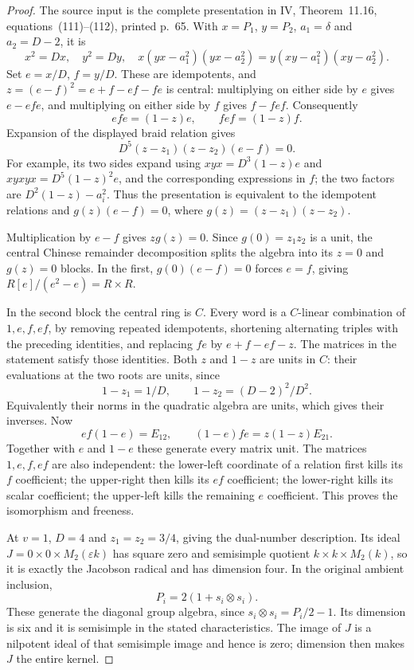 \begin{proof}
The source input is the complete presentation in IV, Theorem~11.16, equations~(111)--(112), printed p.~65. With $x=P_1$, $y=P_2$, $a_1=\delta$ and $a_2=D-2$, it is
\[
 x^2=Dx,\quad y^2=Dy,\quad
 x(yx-a_1^2)(yx-a_2^2)=y(xy-a_1^2)(xy-a_2^2).
\]
Set $e=x/D$, $f=y/D$. These are idempotents, and $z=(e-f)^2=e+f-ef-fe$ is central: multiplying on either side by $e$ gives $e-efe$, and multiplying on either side by $f$ gives $f-fef$. Consequently
\[
 efe=(1-z)e,\qquad fef=(1-z)f.
\]
Expansion of the displayed braid relation gives
\[
 D^5(z-z_1)(z-z_2)(e-f)=0.
\]
For example, its two sides expand using $xyx=D^3(1-z)e$ and $xyxyx=D^5(1-z)^2e$, and the corresponding expressions in $f$; the two factors are $D^2(1-z)-a_i^2$. Thus the presentation is equivalent to the idempotent relations and $g(z)(e-f)=0$, where $g(z)=(z-z_1)(z-z_2)$.

Multiplication by $e-f$ gives $zg(z)=0$. Since $g(0)=z_1z_2$ is a unit, the central Chinese remainder decomposition splits the algebra into its $z=0$ and $g(z)=0$ blocks. In the first, $g(0)(e-f)=0$ forces $e=f$, giving $R[e]/(e^2-e)=R\times R$.

In the second block the central ring is $C$. Every word is a $C$-linear combination of $1,e,f,ef$, by removing repeated idempotents, shortening alternating triples with the preceding identities, and replacing $fe$ by $e+f-ef-z$. The matrices in the statement satisfy those identities. Both $z$ and $1-z$ are units in $C$: their evaluations at the two roots are units, since
\[
 1-z_1=1/D,\qquad 1-z_2=(D-2)^2/D^2.
\]
Equivalently their norms in the quadratic algebra are units, which gives their inverses. Now
\[
 ef(1-e)=E_{12},\qquad (1-e)fe=z(1-z)E_{21}.
\]
Together with $e$ and $1-e$ these generate every matrix unit. The matrices $1,e,f,ef$ are also independent: the lower-left coordinate of a relation first kills its $f$ coefficient; the upper-right then kills its $ef$ coefficient; the lower-right kills its scalar coefficient; the upper-left kills the remaining $e$ coefficient. This proves the isomorphism and freeness.

At $v=1$, $D=4$ and $z_1=z_2=3/4$, giving the dual-number description. Its ideal
$J=0\times0\times M_2(\varepsilon k)$ has square zero and semisimple quotient $k\times k\times M_2(k)$, so it is exactly the Jacobson radical and has dimension four. In the original ambient inclusion,
\[
 P_i=2(1+s_i\otimes s_i).
\]
These generate the diagonal group algebra, since $s_i\otimes s_i=P_i/2-1$. Its dimension is six and it is semisimple in the stated characteristics. The image of $J$ is a nilpotent ideal of that semisimple image and hence is zero; dimension then makes $J$ the entire kernel.


\end{proof}
